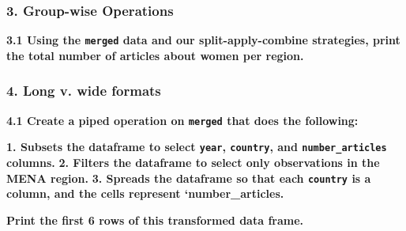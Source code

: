 \documentclass[]{book}
\newenvironment{Shaded}{\begin{snugshade}}{\end{snugshade}}
\newcommand{\CommentTok}[1]{\textcolor[rgb]{0.56,0.35,0.01}{\textit{#1}}}
\newcommand{\DataTypeTok}[1]{\textcolor[rgb]{0.13,0.29,0.53}{#1}}
\newcommand{\DecValTok}[1]{\textcolor[rgb]{0.00,0.00,0.81}{#1}}
\newcommand{\KeywordTok}[1]{\textcolor[rgb]{0.13,0.29,0.53}{\textbf{#1}}}
\newcommand{\NormalTok}[1]{#1}
\newcommand{\OperatorTok}[1]{\textcolor[rgb]{0.81,0.36,0.00}{\textbf{#1}}}
\newcommand{\StringTok}[1]{\textcolor[rgb]{0.31,0.60,0.02}{#1}}
\begin{document}
\hypertarget{group-wise-operations}{%
\subsubsection*{3. Group-wise Operations}\label{group-wise-operations}}

\textbf{3.1 Using the \texttt{merged} data and our \textbf{split-apply-combine} strategies, print the total number of articles about women per region.}

\begin{Shaded}
\end{Shaded}

\hypertarget{long-v.-wide-formats}{%
\subsubsection*{4. Long v. wide formats}\label{long-v.-wide-formats}}

\textbf{4.1 Create a piped operation on \texttt{merged} that does the following:}

\textbf{1. Subsets the dataframe to select \texttt{year}, \texttt{country}, and \texttt{number\_articles} columns.}
\textbf{2. Filters the dataframe to select only observations in the MENA region.}
\textbf{3. Spreads the dataframe so that each \texttt{country} is a column, and the cells represent `number\_articles.}

\textbf{Print the first 6 rows of this transformed data frame.}

\begin{Shaded}
\end{Shaded}
\end{document}
